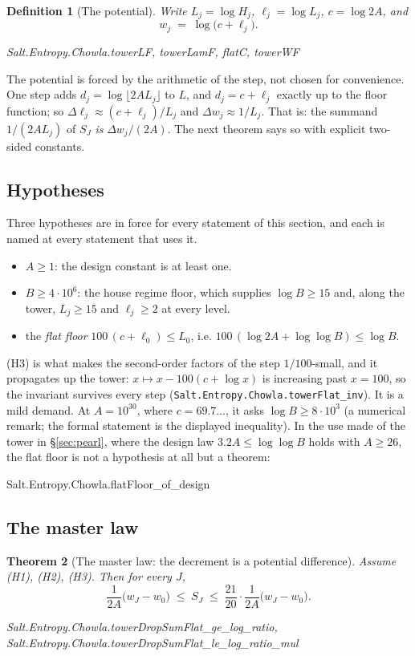 \documentclass[11pt]{amsart}
\newcommand{\leanname}[1]{\par{\noindent\small\ttfamily\raggedright #1\par}}
\newcommand{\leaninline}[1]{{\small\texttt{#1}}}
\newtheorem{theorem}{Theorem}[section]
\newtheorem{definition}[theorem]{Definition}
\theoremstyle{remark}
\begin{document}
\begin{definition}[The potential]\label{def:potential}
Write $L_j = \log H_j$, $\ell_j = \log L_j$, $c = \log 2A$, and
\[
w_j \;=\; \log\bigl(c + \ell_j\bigr).
\]
\leanname{Salt.Entropy.Chowla.towerLF, towerLamF, flatC, towerWF}
\end{definition}

The potential is forced by the arithmetic of the step, not chosen for
convenience. One step adds $d_j = \log\lfloor 2A L_j\rfloor$ to $L$, and
$d_j = c + \ell_j$ exactly up to the floor function; so
$\Delta\ell_j \approx (c+\ell_j)/L_j$ and
$\Delta w_j \approx 1/L_j$. That is: the summand $1/(2AL_j)$ of $S_J$
\emph{is} $\Delta w_j/(2A)$. The next theorem says so with explicit
two-sided constants.

\subsection{Hypotheses}
Three hypotheses are in force for every statement of this section, and
each is named at every statement that uses it.
\begin{itemize}
\item[(H1)] $A \ge 1$: the design constant is at least one.
\item[(H2)] $B \ge 4\cdot 10^{6}$: the house regime floor, which supplies
  $\log B \ge 15$ and, along the tower, $L_j \ge 15$ and $\ell_j \ge 2$
  at every level.
\item[(H3)] the \emph{flat floor} $100\,(c + \ell_0) \le L_0$, i.e.
  $100\,(\log 2A + \log\log B) \le \log B$.
\end{itemize}
(H3) is what makes the second-order factors of the step $1/100$-small, and
it propagates up the tower: $x \mapsto x - 100(c + \log x)$ is increasing
past $x = 100$, so the invariant survives every step
(\leaninline{Salt.Entropy.Chowla.towerFlat\_inv}). It is a mild demand. At
$A = 10^{30}$, where $c = 69.7\ldots$, it asks $\log B \ge 8\cdot10^{3}$
(a numerical remark; the formal statement is the displayed inequality). In
the use made of the tower in \S\ref{sec:pearl}, where the design law
$3.2A \le \log\log B$ holds with $A \ge 26$, the flat floor is not a
hypothesis at all but a theorem:
\leanname{Salt.Entropy.Chowla.flatFloor\_of\_design}

\subsection{The master law}

\begin{theorem}[The master law: the decrement is a potential
difference]\label{thm:master}
Assume (H1), (H2), (H3). Then for every $J$,
\[
\frac{1}{2A}\bigl(w_J - w_0\bigr)
\;\le\; S_J \;\le\;
\frac{21}{20}\cdot\frac{1}{2A}\bigl(w_J - w_0\bigr).
\]
\leanname{Salt.Entropy.Chowla.\allowbreak towerDropSumFlat\_ge\_log\_ratio,
Salt.Entropy.Chowla.\allowbreak towerDropSumFlat\_le\_log\_ratio\_mul}
\end{theorem}
\end{document}
